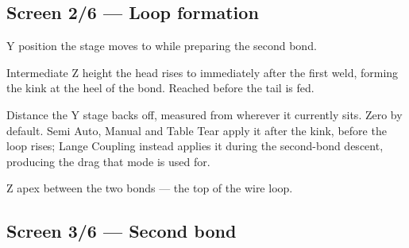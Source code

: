 
\subsection*{Screen 2/6 --- Loop formation}


\begin{description}[leftmargin=!,labelwidth=26mm,style=nextline,font=\normalfont\ttfamily]
\item[Stepback] Y position the stage moves to while preparing the second bond.
\item[Kink Height] Intermediate Z height the head rises to immediately after
  the first weld, forming the kink at the heel of the bond. Reached before the
  tail is fed.
\item[Reverse] Distance the Y stage backs off, measured from wherever it
  currently sits. Zero by default. Semi Auto, Manual and Table Tear apply it
  after the kink, before the loop rises; Lange Coupling instead applies it
  during the second-bond descent, producing the drag that mode is used for.
\item[Loop Height] Z apex between the two bonds --- the top of the wire loop.
\end{description}


\subsection*{Screen 3/6 --- Second bond}


